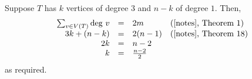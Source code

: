 Suppose $T$ has $k$ vertices of degree $3$ and $n-k$ of degree $1$. Then,
\begin{equation*}
	\begin{array}{rlll}
		\sum_{v \in V(T)} \text{deg}\ v &=& 2m & \text{(\cite{notes}, Theorem 1)}\\
		3k+(n-k) &=& 2(n-1) & \text{(\cite{notes}, Theorem 18)}\\
2k &=& n-2 &\\
k &=&\frac{n-2}{2} &
\end{array}
\end{equation*}
as required.
